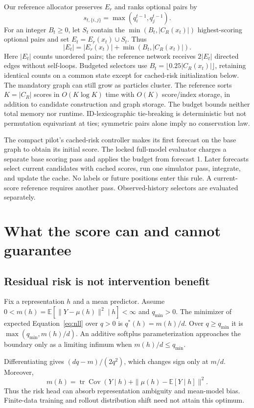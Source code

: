 Our reference allocator preserves $E_r$ and ranks optional pairs by
\begin{equation}
 s_{t,\{i,j\}}=\max(q_i^{t-1},q_j^{t-1}).
\end{equation}
For an integer $B_t\ge0$, let $S_t$ contain the $\min(B_t,|C_R(x_t)|)$ highest-scoring optional pairs and set $E_t=E_r(x_t)\cup S_t$. Thus
\begin{equation}
 |E_t|=|E_r(x_t)|+\min(B_t,|C_R(x_t)|).
 \label{eq:budget}
\end{equation}
Here $|E_t|$ counts unordered pairs; the reference network receives $2|E_t|$ directed edges without self-loops. Budgeted selectors use $B_t=\lfloor0.25|C_R(x_t)|\rfloor$, retaining identical counts on a common state except for cached-risk initialization below. The mandatory graph can still grow as particles cluster. The reference sorts $K=|C_R|$ scores in $O(K\log K)$ time with $O(K)$ score/index storage, in addition to candidate construction and graph storage. The budget bounds neither total memory nor runtime. ID-lexicographic tie-breaking is deterministic but not permutation equivariant at ties; symmetric pairs alone imply no conservation law.

The compact pilot's cached-risk controller makes its first forecast on the base graph to obtain its initial score. The locked full-model evaluator charges a separate base scoring pass and applies the budget from forecast 1. Later forecasts select current candidates with cached scores, run one simulator pass, integrate, and update the cache. No labels or future positions enter this rule. A current-score reference requires another pass. Observed-history selectors are evaluated separately.

\section{What the score can and cannot guarantee}
\subsection{Residual risk is not intervention benefit}
\begin{proposition}
Fix a representation $h$ and a mean predictor. Assume $0<m(h)=\mathbb E[\|Y-\mu(h)\|^2\mid h]<\infty$ and $q_{\min}>0$. The minimizer of expected Equation~\ref{eq:nll} over $q>0$ is $q^*(h)=m(h)/d$. Over $q\ge q_{\min}$ it is $\max(q_{\min},m(h)/d)$. An additive softplus parameterization approaches the boundary only as a limiting infimum when $m(h)/d\le q_{\min}$.
\end{proposition}
Differentiating gives $(dq-m)/(2q^2)$, which changes sign only at $m/d$. Moreover,
\begin{equation}
 m(h)=\operatorname{tr}\operatorname{Cov}(Y\mid h)
       +\|\mu(h)-\mathbb E[Y\mid h]\|^2.
\end{equation}
Thus the risk head can absorb representation ambiguity and mean-model bias. Finite-data training and rollout distribution shift need not attain this optimum.

